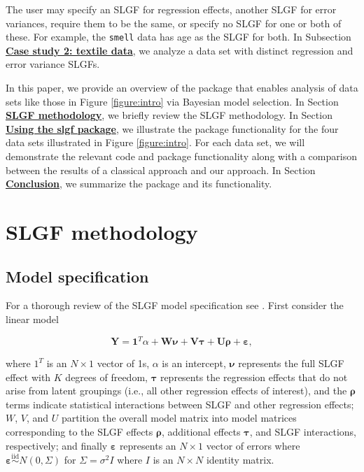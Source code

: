 The user may specify an SLGF for regression effects, another SLGF for error variances, require them to be the same, or specify no SLGF for one or both of these. For example, the \texttt{smell} data has age as the SLGF for both. In Subsection \hyperlink{subsection:textile}{\textbf{Case study 2: textile data}}, we analyze a data set with distinct regression and error variance SLGFs.  

In this paper, we provide an overview of the  package that enables analysis of data sets like those in Figure \ref{figure:intro} via Bayesian model selection. In Section \hyperlink{section:methodology}{\textbf{SLGF methodology}}, we briefly review the SLGF methodology. In Section \hyperlink{section:package}{\textbf{Using the slgf package}}, we illustrate the package functionality for the four data sets illustrated in Figure \ref{figure:intro}. For each data set, we will demonstrate the relevant code and package functionality along with a comparison between the results of a classical approach and our approach. In Section \hyperlink{section:conclusion}{\textbf{Conclusion}}, we summarize the package and its functionality. 

\section{SLGF methodology}\hypertarget{section:methodology}{}

\subsection{Model specification}\hypertarget{subsection:modelspec}{}

For a thorough review of the SLGF model specification see \citet{technometrics_paper}. First consider the linear model

\begin{equation}
\boldsymbol{Y}=\bm{1}^T \alpha + \bm{W}\boldsymbol{\nu}+\bm{V}\boldsymbol{\tau}+\bm{U}\boldsymbol{\rho}+\boldsymbol{\varepsilon,}\label{equation:WVUmodel}
\end{equation}

\noindent
where $1^T$ is an $N\times 1$ vector of 1s, $\alpha$ is an intercept, $\boldsymbol{\nu}$ represents the full SLGF effect with $K$ degrees of freedom, $\boldsymbol{\tau}$ represents the regression effects that do not arise from latent groupings (i.e., all other regression effects of interest), and the $\boldsymbol{\rho}$ terms indicate statistical interactions between SLGF and other regression effects; $W$, $V$, and $U$ partition the overall model matrix into model matrices corresponding to the SLGF effects $\boldsymbol{\rho}$, additional effects $\boldsymbol{\tau}$, and SLGF interactions, respectively; and finally $\boldsymbol{\varepsilon}$ represents an $N\times 1$ vector of errors where $\boldsymbol{\varepsilon}\overset{\text{iid}}{\sim}N(0,\Sigma)$ for $\Sigma=\sigma^2I$ where $I$ is an $N\times N$ identity matrix.


